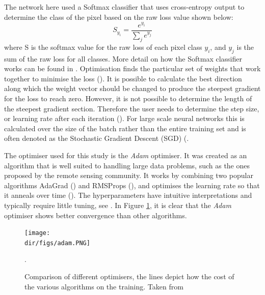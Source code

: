 The network here used a Softmax classifier that uses cross-entropy output to determine the class of the pixel based on the raw loss value shown below:
\[S_{y_i} = \frac{e^{y_i}}{\sum_j e^{y_j}}\]
where S is the softmax value for the raw loss of each pixel class $y_i$, and $y_j$ is the sum of the raw loss for all classes.
More detail on how the Softmax classifier works can be found in \citet{Richmond19b}. Optimisation finds the particular set of weights that work together to minimise the loss (\cite{Karpathy_opt}). It is possible to calculate the best direction along which the weight vector should be changed to produce the steepest gradient for the loss to reach zero. However, it is not possible to determine the length of the steepest gradient section. Therefore the user needs to determine the step size, or learning rate after each iteration (\cite{Karpathy_opt}). For large scale neural networks this is calculated over the size of the batch rather than the entire training set and is often denoted as the Stochastic Gradient Descent (SGD) (\cite{Bottou98,Sutskever13}.
\par 
The optimiser used for this study is the \textit{Adam} optimiser. It was created as an algorithm that is well suited to handling large data problems, such as the ones proposed by the remote sensing community. It works by combining two popular algorithms AdaGrad (\cite{duchi11}) and RMSProps (\cite{tielman12}), and optimises the learning rate so that it anneals over time (\cite{kingma14}). The hyperparameters have intuitive interpretations and typically require little tuning, see \citet{kingma14}. In Figure \ref{fig.adam}, it is clear that the \textit{Adam} optimiser shows better convergence than other algorithms.

\begin{figure}[htpb]
    \centering
    \texttt{[image: \\dir/figs/adam.PNG]}
    \caption[Comparison of different optimisers]{Comparison of different optimisers, the lines depict how the cost of the various algorithms on the training. Taken from \citet{kingma14}}.
    \label{fig.adam}
\end{figure}
